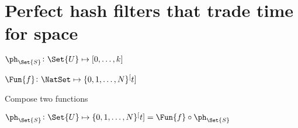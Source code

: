 \documentclass[ ../main.tex]{subfiles}
\begin{document}
\section{Perfect hash filters that trade time for space}

$\ph_{\Set{S}} \colon \Set{U} \mapsto [0,\ldots,k]$

$\Fun{f} \colon \NatSet \mapsto \{0,1,\ldots,N\}^[t]$

Compose two functions

$\ph_{\Set{S}} \colon \Set{U} \mapsto \{0,1,\ldots,N\}^[t] = \Fun{f} \circ \ph_{\Set{S}}$
\end{document}
